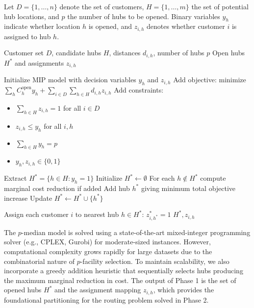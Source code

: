 \documentclass[conference]{IEEEtran}
\begin{document}
Let $D = \{1,\dots,n\}$ denote the set of customers, $H = \{1,\dots,m\}$ the set of potential hub locations, and $p$ the number of hubs to be opened. Binary variables $y_h$ indicate whether location $h$ is opened, and $z_{i,h}$ denotes whether customer $i$ is assigned to hub $h$.

\begin{algorithm}[htbp]
\caption{Phase 1: p-Median Hub Location}
\begin{algorithmic}[1]
\REQUIRE Customer set $D$, candidate hubs $H$, distances $d_{i,h}$, number of hubs $p$
\ENSURE Open hubs $H^*$ and assignments $z_{i,h}$

\STATE Initialize MIP model with decision variables $y_h$ and $z_{i,h}$
\STATE Add objective: minimize $\sum_{h} C_h^{\text{open}} y_h + \sum_{i \in D} \sum_{h \in H} d_{i,h} z_{i,h}$
\STATE Add constraints:
\begin{itemize}
  \item $\sum_{h \in H} z_{i,h} = 1$ for all $i \in D$
  \item $z_{i,h} \le y_h$ for all $i,h$
  \item $\sum_{h \in H} y_h = p$
  \item $y_h, z_{i,h} \in \{0,1\}$
\end{itemize}

    \STATE Extract $H^* = \{h \in H : y_h = 1\}$
\ELSE
    \STATE Initialize $H^* \leftarrow \emptyset$
        \STATE For each $h \notin H^*$ compute marginal cost reduction if added
        \STATE Add hub $h^*$ giving minimum total objective increase
        \STATE Update $H^* \leftarrow H^* \cup \{h^*\}$
    \ENDWHILE
\ENDIF

\STATE Assign each customer $i$ to nearest hub $h \in H^*$: $z^*_{i,h^*} = 1$
\RETURN $H^*, z_{i,h}$
\end{algorithmic}
\end{algorithm}

The $p$-median model is solved using a state-of-the-art mixed-integer programming solver (e.g., CPLEX, Gurobi) for moderate-sized instances. However, computational complexity grows rapidly for large datasets due to the combinatorial nature of $p$-facility selection. To maintain scalability, we also incorporate a greedy addition heuristic that sequentially selects hubs producing the maximum marginal reduction in cost. The output of Phase 1 is the set of opened hubs $H^*$ and the assignment mapping $z_{i,h}$, which provides the foundational partitioning for the routing problem solved in Phase 2.
\end{document}
